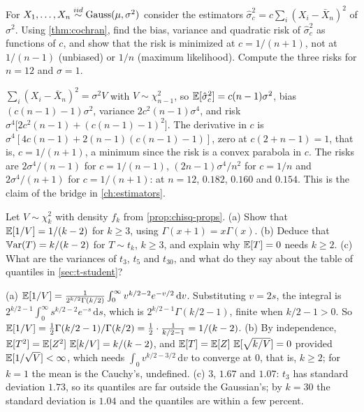 \begin{exercise}
\label{ex:t-nplus1}
For $X_1, \ldots, X_n \stackrel{iid}{\sim} \text{Gauss}(\mu, \sigma^2)$ consider the estimators $\hat{\sigma}^2_c = c\sum_i(X_i - \bar{X}_n)^2$ of $\sigma^2$. Using \cref{thm:cochran}, find the bias, variance and quadratic risk of $\hat{\sigma}^2_c$ as functions of $c$, and show that the risk is minimized at $c = 1/(n+1)$, not at $1/(n-1)$ (unbiased) or $1/n$ (maximum likelihood). Compute the three risks for $n = 12$ and $\sigma = 1$.
\end{exercise}
\begin{solution}
$\sum_i(X_i - \bar{X}_n)^2 = \sigma^2 V$ with $V \sim \chi^2_{n-1}$, so $\operatorname*{\mathbb{E}}[\hat{\sigma}^2_c] = c(n-1)\sigma^2$, bias $(c(n-1) - 1)\sigma^2$, variance $2c^2(n-1)\sigma^4$, and risk $\sigma^4\big[2c^2(n-1) + (c(n-1) - 1)^2\big]$. The derivative in $c$ is $\sigma^4[4c(n-1) + 2(n-1)(c(n-1) - 1)]$, zero at $c(2 + n - 1) = 1$, that is, $c = 1/(n+1)$, a minimum since the risk is a convex parabola in $c$. The risks are $2\sigma^4/(n-1)$ for $c = 1/(n-1)$, $(2n-1)\sigma^4/n^2$ for $c = 1/n$ and $2\sigma^4/(n+1)$ for $c = 1/(n+1)$: at $n = 12$, $0.182$, $0.160$ and $0.154$. This is the claim of the bridge in \cref{ch:estimators}.
\end{solution}

\begin{exercise}
\label{ex:t-variance}
Let $V \sim \chi^2_k$ with density $f_k$ from \cref{prop:chisq-props}. (a) Show that $\operatorname*{\mathbb{E}}[1/V] = 1/(k-2)$ for $k \geq 3$, using $\Gamma(x + 1) = x\Gamma(x)$. (b) Deduce that $\operatorname*{\mathbb{V}\text{ar}}(T) = k/(k-2)$ for $T \sim t_k$, $k \geq 3$, and explain why $\operatorname*{\mathbb{E}}[T] = 0$ needs $k \geq 2$. (c) What are the variances of $t_3$, $t_5$ and $t_{30}$, and what do they say about the table of quantiles in \cref{sec:t-student}?
\end{exercise}
\begin{solution}
(a) $\operatorname*{\mathbb{E}}[1/V] = \frac{1}{2^{k/2}\Gamma(k/2)}\int_0^\infty v^{k/2 - 2}e^{-v/2}\,\mathrm{d}v$. Substituting $v = 2s$, the integral is $2^{k/2 - 1}\int_0^\infty s^{k/2 - 2}e^{-s}\,\mathrm{d}s$, which is $2^{k/2-1}\Gamma(k/2 - 1)$, finite when $k/2 - 1 > 0$. So $\operatorname*{\mathbb{E}}[1/V] = \frac12\Gamma(k/2 - 1)/\Gamma(k/2) = \frac12 \cdot \frac{1}{k/2 - 1} = 1/(k-2)$. (b) By independence, $\operatorname*{\mathbb{E}}[T^2] = \operatorname*{\mathbb{E}}[Z^2]\,\operatorname*{\mathbb{E}}[k/V] = k/(k-2)$, and $\operatorname*{\mathbb{E}}[T] = \operatorname*{\mathbb{E}}[Z]\,\operatorname*{\mathbb{E}}[\sqrt{k/V}] = 0$ provided $\operatorname*{\mathbb{E}}[1/\sqrt{V}] < \infty$, which needs $\int_0 v^{k/2 - 3/2}\,\mathrm{d}v$ to converge at $0$, that is, $k \geq 2$; for $k = 1$ the mean is the Cauchy's, undefined. (c) $3$, $1.67$ and $1.07$: $t_3$ has standard deviation $1.73$, so its quantiles are far outside the Gaussian's; by $k = 30$ the standard deviation is $1.04$ and the quantiles are within a few percent.
\end{solution}

